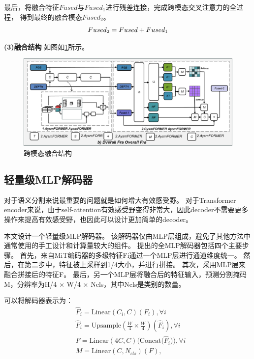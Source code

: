 最后，将融合特征$Fused$与$Fused_1$进行残差连接，完成跨模态交叉注意力的全过程，
得到最终的融合模态$Fused_2$。
\begin{equation}
	Fused_2 = Fused + Fused_1\\
\end{equation}

\textbf{(3)融合结构}
如图如\ref{图：跨模态融合结构}所示。
\begin{figure}[h]
	\centering
	\includegraphics[width=\textwidth]{figures/跨模态融合结构.png}
	\caption{跨模态融合结构}
	\label{图：跨模态融合结构}
\end{figure}


\subsection{轻量级MLP解码器}
对于语义分割来说最重要的问题就是如何增大有效感受野。
对于Transformer encoder来说，由于self-attention有效感受野变得非常大，因此decoder不需要更多操作来提高有效感受野，也因此可以设计更加简单的decoder。

本文设计一个轻量级MLP解码器。
该解码器仅由MLP层组成，避免了其他方法中通常使用的手工设计和计算量较大的组件。
提出的全MLP解码器包括四个主要步骤。
首先，来自MiT编码器的多级特征Fi通过一个MLP层进行通道维度统一。
然后，在第二步中，特征被上采样到1/4大小，并进行拼接。
其次，采用MLP层来融合拼接后的特征F。
最后，另一个MLP层将融合后的特征输入，预测分割掩码M，分辨率为H/4 × W/4 × Ncls，其中Ncls是类别的数量。

可以将解码器表示为：
\begin{equation}
	\begin{aligned}
		&{\hat{F}_i = \text{Linear}(C_i, C)(F_i)}, \forall i\\
		&{{\hat{F}}_i = \text{Upsample}(\frac{W}{4} \times \frac{W}{4})({\hat{F}}_i)}, \forall i\\
		&{{F} = \text{Linear}(4C, C)(\text{Concat}({\hat{F}}_i})), \forall i\\
		&{{M} = \text{Linear}(C, N_{cls})({F})},
	\end{aligned}
	\label{eqn:mlp}
\end{equation}

